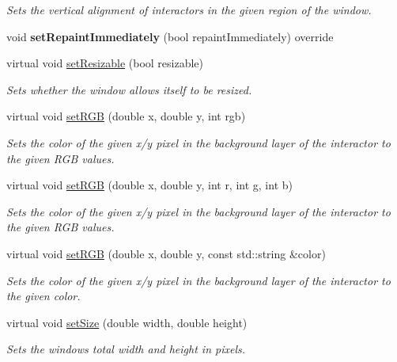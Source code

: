 \begin{DoxyCompactItemize}
\begin{DoxyCompactList}\small\item\em Sets the vertical alignment of interactors in the given region of the window. \end{DoxyCompactList}\item 
void {\bfseries set\+Repaint\+Immediately} (bool repaint\+Immediately) override
\item 
virtual void \mbox{\hyperlink{classsgl_1_1GWindow_a8bf0c7d9f9aea44fa74f63a358df7d22}{set\+Resizable}} (bool resizable)
\begin{DoxyCompactList}\small\item\em Sets whether the window allows itself to be resized. \end{DoxyCompactList}\item 
virtual void \mbox{\hyperlink{classsgl_1_1GDrawingSurface_a8bcbd65fa784bdab1e66a9efd381162d}{set\+R\+GB}} (double x, double y, int rgb)
\begin{DoxyCompactList}\small\item\em Sets the color of the given x/y pixel in the background layer of the interactor to the given R\+GB values. \end{DoxyCompactList}\item 
virtual void \mbox{\hyperlink{classsgl_1_1GDrawingSurface_a81202471d4fc9f2015aef0bc073acfab}{set\+R\+GB}} (double x, double y, int r, int g, int b)
\begin{DoxyCompactList}\small\item\em Sets the color of the given x/y pixel in the background layer of the interactor to the given R\+GB values. \end{DoxyCompactList}\item 
virtual void \mbox{\hyperlink{classsgl_1_1GDrawingSurface_ae9a228792d4bb4b628350f39eaa3ad12}{set\+R\+GB}} (double x, double y, const std\+::string \&color)
\begin{DoxyCompactList}\small\item\em Sets the color of the given x/y pixel in the background layer of the interactor to the given color. \end{DoxyCompactList}\item 
virtual void \mbox{\hyperlink{classsgl_1_1GWindow_aca25d49481f9bf5fc8f7df4c086c4ce7}{set\+Size}} (double width, double height)
\begin{DoxyCompactList}\small\item\em Sets the window\textquotesingle{}s total width and height in pixels. \end{DoxyCompactList}\item 

\end{DoxyCompactItemize}
